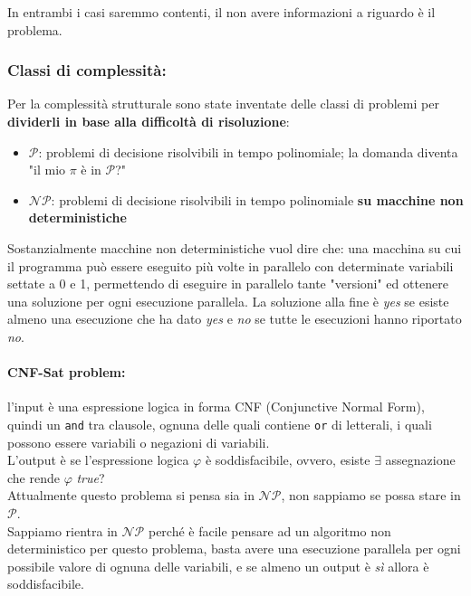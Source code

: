 \documentclass[11pt]{article}
\begin{document}
	In entrambi i casi saremmo contenti, il non avere informazioni a riguardo è il problema.\\
	
	\newpage
	
	\subsubsection{Classi di complessità:} 
	
	Per la complessità strutturale sono state inventate delle classi di problemi per \textbf{dividerli in base alla difficoltà di risoluzione}: 
	\begin{itemize}
		\item $\mathcal{P}$: problemi di decisione risolvibili in tempo polinomiale; la domanda diventa "il mio $\pi$ è in $\mathcal{P}$?"
		\item $\mathcal{NP}$: problemi di decisione risolvibili in tempo polinomiale \textbf{su macchine non deterministiche} 
	\end{itemize}
	
	Sostanzialmente macchine non deterministiche vuol dire che: una macchina su cui il programma può essere eseguito più volte in parallelo con determinate variabili settate a 0 e 1, permettendo di eseguire in parallelo tante "versioni" ed ottenere una soluzione per ogni esecuzione parallela. La soluzione alla fine è \textit{yes} se esiste almeno una esecuzione che ha dato \textit{yes} e \textit{no} se tutte le esecuzioni hanno riportato \textit{no}. \\
	
	\paragraph{CNF-Sat problem:} l'input è una espressione logica in forma CNF (Conjunctive Normal Form), quindi un \texttt{and} tra clausole, ognuna delle quali contiene \texttt{or} di letterali, i quali possono essere variabili o negazioni di variabili.\\
	
	L'output è se l'espressione logica $\varphi$ è soddisfacibile, ovvero, esiste $\exists$ assegnazione che rende $\varphi$ \textit{true}? \\
	Attualmente questo problema si pensa sia in $\mathcal{NP}$, non sappiamo se possa stare in $\mathcal{P}$.\\
	
	Sappiamo rientra in $\mathcal{NP}$ perché è facile pensare ad un algoritmo non deterministico per questo problema, basta avere una esecuzione parallela per ogni possibile valore di ognuna delle variabili, e se almeno un output è \textit{sì} allora è soddisfacibile.\\
	
\end{document}

